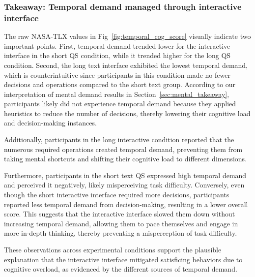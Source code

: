 \subsubsection{Takeaway: Temporal demand managed through interactive interface}
The raw NASA-TLX values in Fig~\ref{fig:temporal_cog_score} visually indicate two important points. First, temporal demand trended lower for the interactive interface in the short QS condition, while it trended higher for the long QS condition. Second, the long text interface exhibited the lowest temporal demand, which is counterintuitive since participants in this condition made no fewer decisions and operations compared to the short text group. According to our interpretation of mental demand results in Section~\ref{sec:mental_takeaway}, participants likely did not experience temporal demand because they applied heuristics to reduce the number of decisions, thereby lowering their cognitive load and decision-making instances.

Additionally, participants in the long interactive condition reported that the numerous required operations created temporal demand, preventing them from taking mental shortcuts and shifting their cognitive load to different dimensions.

Furthermore, participants in the short text QS expressed high temporal demand and perceived it negatively, likely misperceiving task difficulty. Conversely, even though the short interactive interface required more decisions, participants reported less temporal demand from decision-making, resulting in a lower overall score. This suggests that the interactive interface slowed them down without increasing temporal demand, allowing them to pace themselves and engage in more in-depth thinking, thereby preventing a misperception of task difficulty.

These observations across experimental conditions support the plausible explanation that the interactive interface mitigated satisficing behaviors due to cognitive overload, as evidenced by the different sources of temporal demand.



